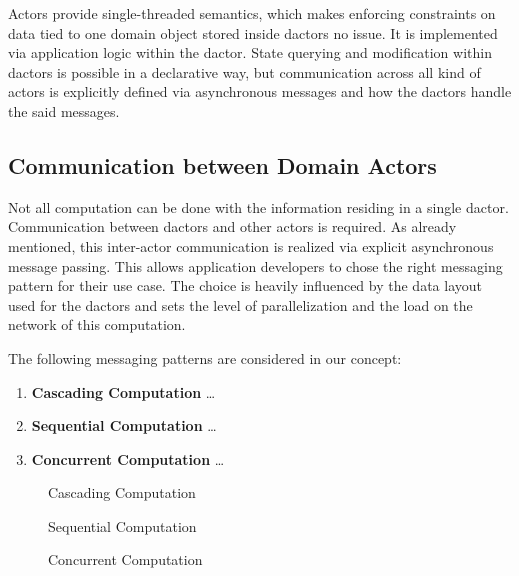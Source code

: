     Actors provide single-threaded semantics, which makes enforcing constraints on data tied to one domain object stored inside \glspl{dactor} no issue.
    It is implemented via application logic within the \gls{dactor}.
    State querying and modification within \glspl{dactor} is possible in a declarative way, but communication across all kind of actors is explicitly defined via asynchronous messages and how the \glspl{dactor} handle the said messages.

  \subsection{Communication between Domain Actors}
    Not all computation can be done with the information residing in a single \gls{dactor}.
    Communication between \glspl{dactor} and other actors is required.
    As already mentioned, this inter-actor communication is realized via explicit asynchronous message passing.
    This allows application developers to chose the right messaging pattern for their use case.
    The choice is heavily influenced by the data layout used for the \glspl{dactor} and sets the level of parallelization and the load on the network of this computation.

    The following messaging patterns are considered in our concept:
    \begin{enumerate}
      \item\label{enum:comp_pattern_1} \textbf{Cascading Computation} \dots
      \item\label{enum:comp_pattern_2} \textbf{Sequential Computation} \dots
      \item\label{enum:comp_pattern_3} \textbf{Concurrent Computation} \dots
    \end{enumerate}
  
    \begin{figure}
      \centering
      
      \caption{Cascading Computation}
      \label{fig:comp_pattern_1}
    \end{figure}
  
    \begin{figure}
      \centering
      
      \caption{Sequential Computation}
      \label{fig:comp_pattern_2}
    \end{figure}
  
    \begin{figure}
      \centering
      
      \caption{Concurrent Computation}
      \label{fig:comp_pattern_3}
    \end{figure}


